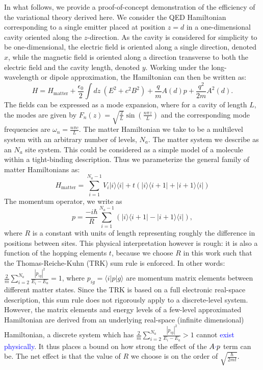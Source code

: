 \documentclass[aps,prl,twocolumn,
	groupedaddress,superscriptaddress,
	amsfonts,amssymb,amsmath,floatfix,
	citeautoscript]{revtex4-1}
\newcommand{\Jadd}[1]{\textcolor{blue}{#1}}
\begin{document}
In what follows, we provide a proof-of-concept demonstration of the efficiency of the variational theory derived here. We consider the QED Hamiltonian corresponding to a single emitter placed at position $z=d$ in a one-dimensional cavity oriented along the $z$-direction. As the cavity is considered for simplicity to be one-dimensional, the electric field is oriented along a single direction, denoted $x$, while the magnetic field is oriented along a direction transverse to both the electric field and the cavity length, denoted $y$. Working under the long-wavelength or dipole approximation, the Hamiltonian can then be written as:
\begin{equation}\label{eq:hamiltonian}
H = H_{\text{matter}}+\frac{\epsilon_0}{2}\int dz~(E^2+c^2B^2)+\frac{q}{m}A(d)p + \frac{q^2}{2m}A^2(d).
\end{equation}
The fields can be expressed as a mode expansion, where for a cavity of length $L$, the modes are given by $F_n(z) = \sqrt{\frac{2}{L}}\sin\left(\frac{n\pi z}{L} \right)$ and the corresponding mode frequencies are $\omega_n = \frac{n\pi c}{L}$. The matter Hamiltonian we take to be a multilevel system with an arbitrary number of levels, $N_a$. The matter system we describe as an $N_a$ site system. This could be considered as a simple model of a molecule within a tight-binding description. Thus we parameterize the general family of matter Hamiltonians as:
\begin{equation}\label{eq:matter_hamiltonian}
H_{\text{matter}} = \sum\limits_{i=1}^{{N_a-1}} V_i|i\rangle\langle i|+t(|i\rangle\langle i+1|+|i+1\rangle\langle i|) 
\end{equation}
The momentum operator, we write as 
\begin{equation}\label{eq:momentum_operator}
p = \frac{-i\hbar}{R}\sum\limits_{i=1}^{N_a-1} \left(|i\rangle\langle i+1|-|i+1\rangle\langle i| \right),
\end{equation}
where $R$ is a constant with units of length representing roughly the difference in positions between sites. This physical interpretation however is rough: it is also a function of the hopping elements $t$, because we choose $R$ in this work such that the Thomas-Reiche-Kuhn (TRK) sum rule is enforced. In other words: $\frac{2}{m}\sum\limits_{i=2}^{N_a}\frac{|p_{ig}|^2}{E_i - E_a} = 1$, where $p_{ig} = \langle i|p|g\rangle$ are momentum matrix elements between different matter states.  Since the TRK is based on a full electronic real-space description, this sum rule does not rigorously apply to a discrete-level system. However, the matrix elements and energy levels of a few-level approximated Hamiltonian  are derived from an underlying real-space (infinite dimensional) Hamiltonian, a discrete system which has  $\frac{2}{m}\sum\limits_{i=2}^{N_a}\frac{|p_{ig}|^2}{E_i - E_a} > 1$ cannot \Jadd{exist physically}. It thus places a bound on how strong the effect of the $A\Jadd{\cdot}p$ term can be. The net effect is that the value of $R$ we choose is on the order of $\sqrt{\frac{\hbar}{2mt}}$.
\end{document}
